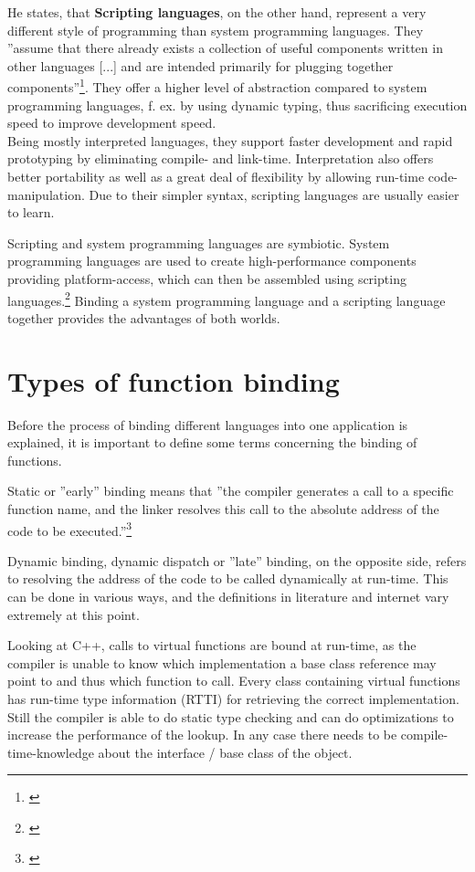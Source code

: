 He states, that \textbf{Scripting languages}, on the other hand, represent a very different style of programming than system programming languages. They ''assume that there already exists a collection of useful components written in other languages [...] and are intended primarily for plugging together components''\footnote{\citep{Ousterhout}}. They offer a higher level of abstraction compared to system programming languages, f. ex. by using dynamic typing, thus sacrificing execution speed to improve development speed.\\ Being mostly interpreted languages, they support faster development and rapid prototyping by eliminating compile- and link-time. Interpretation also offers better portability as well as a great deal of flexibility by allowing run-time code-manipulation. Due to their simpler syntax, scripting languages are usually easier to learn.

Scripting and system programming languages are symbiotic. System programming languages are used to create high-performance components providing platform-access, which can then be assembled using scripting languages.\footnote{\citep{Ousterhout}} Binding a system programming language and a scripting language together provides the advantages of both worlds.


\section{Types of function binding}

Before the process of binding different languages into one application is explained, it is important to define some terms concerning the binding of functions.

Static or ''early'' binding means that ''the compiler generates a call to a specific function name, and the linker resolves this call to the absolute address of the code to be executed.''\footnote{\citep[41]{ThinkingInCPP}}

Dynamic binding, dynamic dispatch or ''late'' binding, on the opposite side, refers to resolving the address of the code to be called dynamically at run-time. This can be done in various ways, and the definitions in literature and internet vary extremely at this point.

Looking at C++, calls to virtual functions are bound at run-time, as the compiler is unable to know which implementation a base class reference may point to and thus which function to call. Every class containing virtual functions has run-time type information (RTTI) for retrieving the correct implementation. Still the compiler is able to do static type checking and can do optimizations to increase the performance of the lookup. In any case there needs to be compile-time-knowledge about the interface / base class of the object. 

